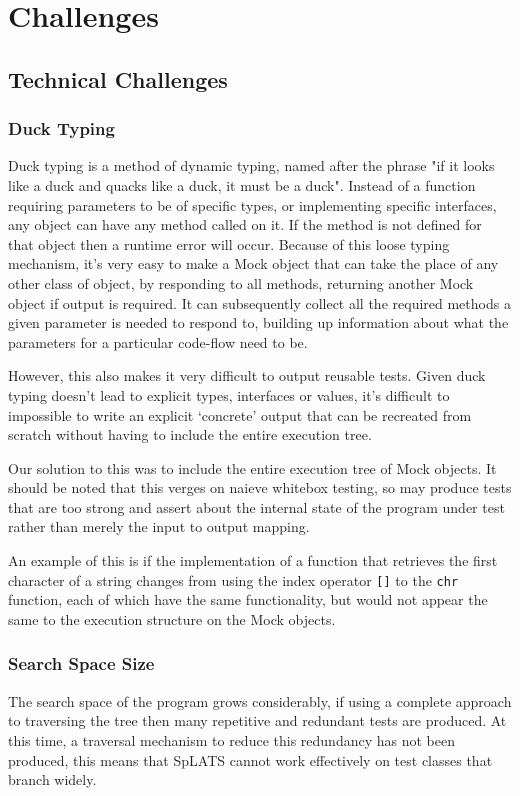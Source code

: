 \chapter{Challenges}
\section{Technical Challenges}
  \subsection{Duck Typing}
    Duck typing is a method of dynamic typing, named after the phrase "if it looks like a duck and quacks like a duck, it must be a duck".
    Instead of a function requiring parameters to be of specific types, or implementing specific interfaces, any object can have any method called on it.
    If the method is not defined for that object then a runtime error will occur.
    Because of this loose typing mechanism, it's very easy to make a Mock object that can take the place of any other class of object, by responding to all methods, returning another Mock object if output is required.
    It can subsequently collect all the required methods a given parameter is
needed to respond to, building up information about what the parameters for a particular code-flow need to be.

    However, this also makes it very difficult to output reusable tests.
    Given duck typing doesn't lead to explicit types, interfaces or values, it's difficult to impossible to write an explicit `concrete' output that can be recreated from scratch without having to include the entire execution tree.

    Our solution to this was to include the entire execution tree of Mock
objects. It should be noted that this verges on naieve whitebox testing, so may
produce tests that are too strong and assert about the internal state of the
program under test rather than merely the input to output mapping.

An example of this is if the implementation of a function that retrieves the
first character of a string changes from using the index operator \texttt{[]} to
the \texttt{chr}
function, each of which have the same functionality, but would not appear the same
to the execution structure on the Mock objects.

  \subsection{Search Space Size}
    The search space of the program grows considerably, if using a complete
approach to traversing the tree then many repetitive and redundant tests are
produced. At this time, a traversal mechanism to reduce this redundancy has not
been produced, this means that SpLATS cannot work effectively on test classes
that branch widely.

